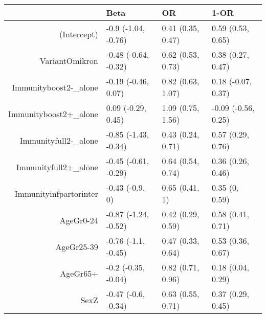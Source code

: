 \begin{table}[ht]
\centering
\begin{tabular}{rlll}
  \hline
 & Beta & OR & 1-OR \\ 
  \hline
(Intercept) & -0.9 (-1.04, -0.76) & 0.41 (0.35, 0.47) & 0.59 (0.53, 0.65) \\ 
  VariantOmikron & -0.48 (-0.64, -0.32) & 0.62 (0.53, 0.73) & 0.38 (0.27, 0.47) \\ 
  Immunityboost2-\_alone & -0.19 (-0.46, 0.07) & 0.82 (0.63, 1.07) & 0.18 (-0.07, 0.37) \\ 
  Immunityboost2+\_alone & 0.09 (-0.29, 0.45) & 1.09 (0.75, 1.56) & -0.09 (-0.56, 0.25) \\ 
  Immunityfull2-\_alone & -0.85 (-1.43, -0.34) & 0.43 (0.24, 0.71) & 0.57 (0.29, 0.76) \\ 
  Immunityfull2+\_alone & -0.45 (-0.61, -0.29) & 0.64 (0.54, 0.74) & 0.36 (0.26, 0.46) \\ 
  Immunityinfpartorinter & -0.43 (-0.9, 0) & 0.65 (0.41, 1) & 0.35 (0, 0.59) \\ 
  AgeGr0-24 & -0.87 (-1.24, -0.52) & 0.42 (0.29, 0.59) & 0.58 (0.41, 0.71) \\ 
  AgeGr25-39 & -0.76 (-1.1, -0.45) & 0.47 (0.33, 0.64) & 0.53 (0.36, 0.67) \\ 
  AgeGr65+ & -0.2 (-0.35, -0.04) & 0.82 (0.71, 0.96) & 0.18 (0.04, 0.29) \\ 
  SexZ & -0.47 (-0.6, -0.34) & 0.63 (0.55, 0.71) & 0.37 (0.29, 0.45) \\ 
   \hline
\end{tabular}
\end{table}
